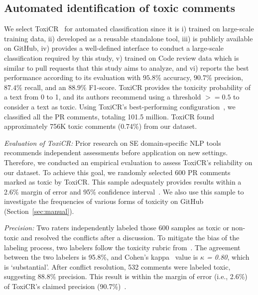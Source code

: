 \subsection{Automated identification of toxic comments}
\label{sec:validation-toxicr}
  We select ToxiCR~\cite{sarker2022automated} for automated classification since it is i) trained on large-scale training data, ii) developed as a reusable standalone tool, iii) is publicly available on GitHub, iv) provides a well-defined interface to conduct a large-scale classification required by this study,  v) trained on Code review data which is similar to pull requests that this study aims to analyze, and vi) reports the best performance according to its evaluation with $95.8\%$ accuracy, $90.7\%$ precision, $87.4\%$ recall, and an $88.9\%$ F1-score. ToxiCR provides the toxicity probability of a text from 0 to 1, and its authors recommend using a threshold $>=0.5$ to consider a text as toxic. Using ToxiCR's best-performing configuration~\cite{sarker2022automated}, we classified all the PR comments, totaling 101.5 million. ToxiCR found approximately 756K toxic comments (0.74\%) from our dataset.

\emph{Evaluation of ToxiCR:} Prior research on SE domain-specific NLP tools~\cite{novielli2018benchmark,novielli2021assessment} recommends independent assessments before application on new settings. Therefore, we conducted an empirical evaluation to assess ToxiCR's reliability on our dataset. To achieve this goal, we randomly selected 600 PR comments marked as toxic by ToxiCR. This sample adequately provides results within a 2.6\%  margin of error and 95\%  confidence interval~\cite{cochran1977sampling}.  We also use this sample to investigate the frequencies of various forms of toxicity on GitHub (Section~\ref{sec:manual}). 



\emph{Precision:}
Two raters independently labeled those 600 samples as toxic or non-toxic and resolved the conflicts after a discussion. To mitigate the bias of the labeling process, two labelers follow the toxicity rubric from~\citet{sarker2022automated}. The agreement between the two labelers is 95.8\%, and Cohen’s kappa~\cite{cohen1960coefficient} value is \emph{$\kappa$ = 0.80}, which is `substantial'.  After conflict resolution, 532 comments were labeled toxic, suggesting $88.8\%$  precision.  
This result is within the margin of error (i.e., 2.6\%) of ToxiCR's claimed precision (90.7\%)~\cite{sarker2022automated}.

